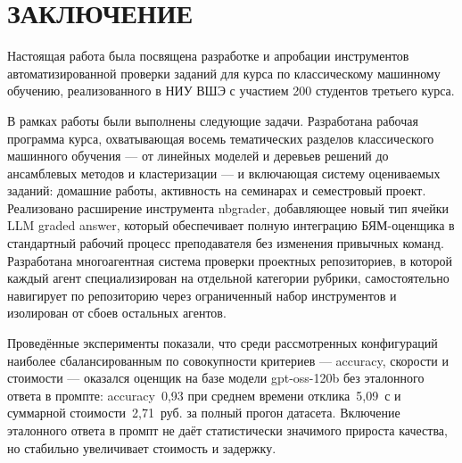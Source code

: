 \chapter*{ЗАКЛЮЧЕНИЕ}
\sloppy

Настоящая работа была посвящена разработке и апробации инструментов автоматизированной проверки заданий для курса по классическому машинному обучению, реализованного в НИУ ВШЭ с участием 200 студентов третьего курса.

В рамках работы были выполнены следующие задачи. Разработана рабочая программа курса, охватывающая восемь тематических разделов классического машинного обучения --- от линейных моделей и деревьев решений до ансамблевых методов и кластеризации --- и включающая систему оцениваемых заданий: домашние работы, активность на семинарах и семестровый проект. Реализовано расширение инструмента nbgrader, добавляющее новый тип ячейки LLM graded answer, который обеспечивает полную интеграцию БЯМ-оценщика в стандартный рабочий процесс преподавателя без изменения привычных команд. Разработана многоагентная система проверки проектных репозиториев, в которой каждый агент специализирован на отдельной категории рубрики, самостоятельно навигирует по репозиторию через ограниченный набор инструментов и изолирован от сбоев остальных агентов.

Проведённые эксперименты показали, что среди рассмотренных конфигураций наиболее сбалансированным по совокупности критериев --- accuracy, скорости и стоимости --- оказался оценщик на базе модели gpt-oss-120b без эталонного ответа в промпте: accuracy~0{,}93 при среднем времени отклика~5{,}09~с и суммарной стоимости~2{,}71~руб. за полный прогон датасета. Включение эталонного ответа в промпт не даёт статистически значимого прироста качества, но стабильно увеличивает стоимость и задержку.

